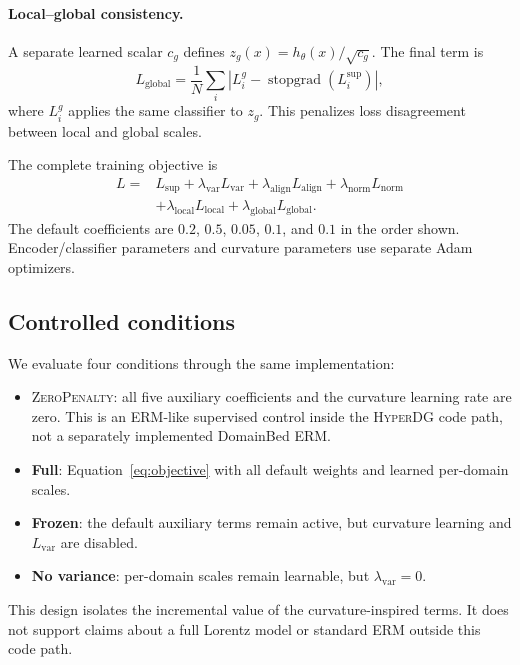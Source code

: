 \documentclass[10pt]{article}
\newcommand{\method}{\textsc{HyperDG}}
\newcommand{\control}{\textsc{ZeroPenalty}}
\begin{document}
\paragraph{Local--global consistency.}
A separate learned scalar $c_g$ defines
$z_g(x)=h_\theta(x)/\sqrt{c_g}$. The final term is
\begin{equation}
    L_{\mathrm{global}}=\frac{1}{N}\sum_i
    \left|L_i^{g}-\operatorname{stopgrad}(L_i^{\mathrm{sup}})\right|,
\end{equation}
where $L_i^g$ applies the same classifier to $z_g$. This penalizes loss
disagreement between local and global scales.

The complete training objective is
\begin{equation}
\begin{split}
    L ={}& L_{\mathrm{sup}}
    +\lambda_{\mathrm{var}}L_{\mathrm{var}}
    +\lambda_{\mathrm{align}}L_{\mathrm{align}}
    +\lambda_{\mathrm{norm}}L_{\mathrm{norm}}\\
    &+\lambda_{\mathrm{local}}L_{\mathrm{local}}
    +\lambda_{\mathrm{global}}L_{\mathrm{global}}.
    \label{eq:objective}
\end{split}
\end{equation}
The default coefficients are $0.2$, $0.5$, $0.05$, $0.1$, and $0.1$ in the
order shown. Encoder/classifier parameters and curvature parameters use
separate Adam optimizers.

\subsection{Controlled conditions}
\label{sec:conditions}

We evaluate four conditions through the same implementation:
\begin{itemize}
    \item \control: all five auxiliary coefficients and the curvature learning
          rate are zero. This is an ERM-like supervised control inside the
          \method{} code path, not a separately implemented DomainBed ERM.
    \item \textbf{Full}: Equation~\ref{eq:objective} with all default weights
          and learned per-domain scales.
    \item \textbf{Frozen}: the default auxiliary terms remain active, but
          curvature learning and $L_{\mathrm{var}}$ are disabled.
    \item \textbf{No variance}: per-domain scales remain learnable, but
          $\lambda_{\mathrm{var}}=0$.
\end{itemize}
This design isolates the incremental value of the curvature-inspired terms. It
does not support claims about a full Lorentz model or standard ERM outside this
code path.
\end{document}
